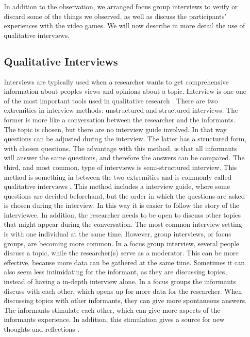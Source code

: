 In addition to the observation, we arranged focus group interviews to verify or discard some of the things we observed, as well as discuss the participants' experiences with the video games. We will now describe in more detail the use of qualitative interviews.  

\subsection{Qualitative Interviews}
Interviews are typically used when a researcher wants to get comprehensive information about peoples views and opinions about a topic. Interview is one one of the most important tools used in qualitative research \cite{interview}. There are two extremities in interview methods: unstructured and structured interviews. The former is more like a conversation between the researcher and the informants. The topic is chosen, but there are no interview guide involved. In that way questions can be adjusted during the interview. The latter has a structured form, with chosen questions. The advantage with this method, is that all informants will answer the same questions, and therefore the answers can be compared. The third, and most common, type of interviews is semi-structured interview. This method is something in between the two extremities and is commonly called qualitative interviews \cite{qualitative}. This method includes a interview guide, where some questions are decided beforehand, but the order in which the questions are asked is chosen during the interview. In this way it is easier to follow the story of the interviewee. In addition, the researcher needs to be open to discuss other topics that might appear during the conversation. The most common interview setting is with one individual at the same time. However, group interviews, or focus groups, are becoming more common. In a focus group interview, several people discuss a topic, while the researcher(s) serve as a moderator. This can be more effective, because more data can be gathered at the same time. Sometimes it can also seem less intimidating for the informant, as they are discussing topics, instead of having a in-depth interview alone. In a focus groups the informants discuss with each other, which opens up for more data for the researcher. When discussing topics with other informants, they can give more spontaneous answers. The informants stimulate each other, which can give more aspects of the informants experience. In addition, this stimulation gives a source for new thoughts and reflections \cite{tjora}. 

